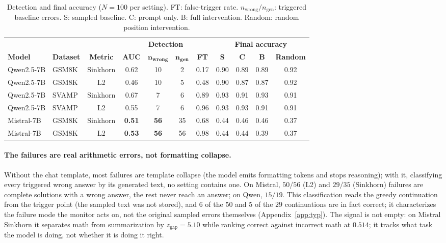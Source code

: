 \documentclass{article}
\begin{document}
\begin{table}[h]
\centering
\small
\caption{Detection and final accuracy ($N=100$ per setting). FT: false-trigger rate. $n_{\text{wrong}}/n_{\text{gen}}$: triggered baseline errors. S: sampled baseline. C: prompt only. B: full intervention. Random: random position intervention.}\label{tab:main}
\begin{tabular}{llccccccccc}
\toprule
& & & \multicolumn{4}{c}{\bf Detection} & \multicolumn{4}{c}{\bf Final accuracy} \\
\cmidrule(lr){4-7}\cmidrule(lr){8-11}
\bf Model & \bf Dataset & \bf Metric & \bf AUC & $\boldsymbol{n_{\text{wrong}}}$ & $\boldsymbol{n_{\text{gen}}}$ & \bf FT & \bf S & \bf C & \bf B & \bf Random \\
\midrule
Qwen2.5-7B & GSM8K & Sinkhorn & 0.62 & 10 & 2  & 0.17 & 0.90 & 0.89 & 0.89 & 0.92 \\
Qwen2.5-7B & GSM8K & L2       & 0.46 & 10 & 5  & 0.48 & 0.90 & 0.87 & 0.87 & 0.92 \\
Qwen2.5-7B & SVAMP & Sinkhorn & 0.67 & 7 & 6  & 0.89 & 0.93 & 0.91 & 0.93 & 0.91 \\
Qwen2.5-7B & SVAMP & L2       & 0.55 & 7 & 6  & 0.96 & 0.93 & 0.93 & 0.91 & 0.91 \\
Mistral-7B & GSM8K & Sinkhorn & \bf 0.51 & \bf 56 & 35 & 0.68 & 0.44 & 0.46 & 0.46 & 0.37 \\
Mistral-7B & GSM8K & L2       & \bf 0.53 & \bf 56 & 56 & 0.98 & 0.44 & 0.44 & 0.39 & 0.37 \\
\bottomrule
\end{tabular}
\end{table}

\paragraph{The failures are real arithmetic errors, not formatting collapse.}
Without the chat template, most failures are template collapse (the model emits formatting tokens and stops reasoning); with it, classifying every triggered wrong answer by its generated text, no setting contains one. On Mistral, $50/56$ (L2) and $29/35$ (Sinkhorn) failures are complete solutions with a wrong answer, the rest never reach an answer; on Qwen, $15/19$. This classification reads the greedy continuation from the trigger point (the sampled text was not stored), and $6$ of the $50$ and $5$ of the $29$ continuations are in fact correct; it characterizes the failure mode the monitor acts on, not the original sampled errors themselves (Appendix~\ref{app:typ}). The signal is not empty: on Mistral Sinkhorn it separates math from summarization by $z_{\text{gap}}=5.10$ while ranking correct against incorrect math at $0.514$; it tracks what task the model is doing, not whether it is doing it right.
\end{document}
